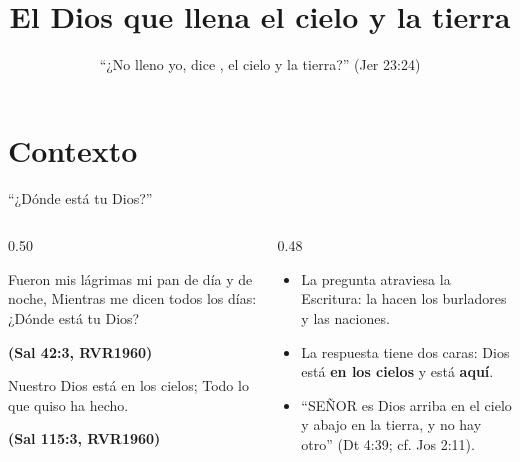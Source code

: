 \documentclass[hyperref={bookmarks=false},aspectratio=169]{beamer}
\title[El Dios presente]{\bfseries{El Dios que llena el cielo y la tierra}}
\subtitle{``¿No lleno yo, dice \SENOR, el cielo y la tierra?'' (Jer 23:24)}
\author{}\institute{}\date{}
\newcommand{\SENOR}{S{\fontsize{0.78em}{1em}\selectfont EÑOR}}
\newcommand{\fuente}[1]{\par\hfill{\upshape\bfseries\footnotesize\textcolor{azul}{#1}}}
\newcommand{\destacar}[1]{\textbf{\textcolor{azul}{#1}}}
\begin{document}
\frame{\titlepage}


\section{Contexto}

\begin{frame}{``¿Dónde está tu Dios?''}
\begin{columns}[c,onlytextwidth]
\begin{column}{0.50\textwidth}
\begin{cita}Fueron mis lágrimas mi pan de día y de noche, Mientras me dicen todos los días: ¿Dónde está tu Dios?\fuente{(Sal 42:3, RVR1960)}\end{cita}
\begin{cita}Nuestro Dios está en los cielos; Todo lo que quiso ha hecho.\fuente{(Sal 115:3, RVR1960)}\end{cita}
\end{column}
\begin{column}{0.48\textwidth}\small
\begin{itemize}
\item La pregunta atraviesa la Escritura: la hacen los burladores y las naciones.
\item La respuesta tiene dos caras: Dios está \destacar{en los cielos} y está \destacar{aquí}.
\item ``\SENOR{} es Dios arriba en el cielo y abajo en la tierra, y no hay otro'' (Dt 4:39; cf. Jos 2:11).
\end{itemize}
\end{column}
\end{columns}
\end{frame}
\end{document}
